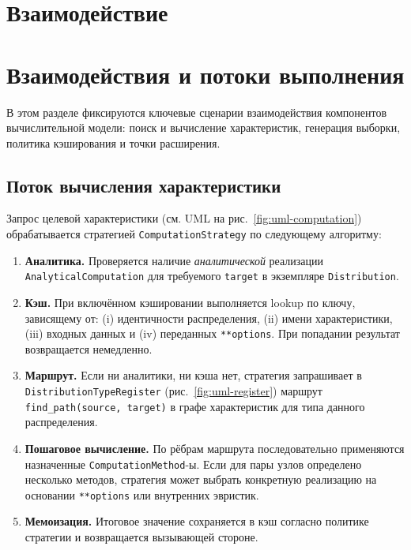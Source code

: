 \section{Взаимодействие}

\section{Взаимодействия и потоки выполнения}
\label{sec:interactions}

В этом разделе фиксируются ключевые сценарии взаимодействия компонентов вычислительной модели:
поиск и вычисление характеристик, генерация выборки, политика кэширования и точки расширения.

\subsection{Поток вычисления характеристики}

Запрос целевой характеристики (см. UML на рис.~\ref{fig:uml-computation}) обрабатывается стратегией
\texttt{ComputationStrategy} по следующему алгоритму:
\begin{enumerate}
  \item \textbf{Аналитика.} Проверяется наличие \emph{аналитической} реализации \texttt{AnalyticalComputation}
        для требуемого \texttt{target} в экземпляре \texttt{Distribution}.
  \item \textbf{Кэш.} При включённом кэшировании выполняется lookup по ключу, зависящему от:
        (i) идентичности распределения, (ii) имени характеристики, (iii) входных данных и
        (iv) переданных \texttt{**options}. При попадании результат возвращается немедленно.
  \item \textbf{Маршрут.} Если ни аналитики, ни кэша нет, стратегия запрашивает в
        \texttt{DistributionTypeRegister} (рис.~\ref{fig:uml-register}) маршрут
        \texttt{find\_path(source, target)} в графе характеристик для типа данного распределения.
  \item \textbf{Пошаговое вычисление.} По рёбрам маршрута последовательно применяются назначенные
        \texttt{ComputationMethod}-ы. Если для пары узлов определено несколько методов, стратегия может
        выбрать конкретную реализацию на основании \texttt{**options} или внутренних эвристик.
  \item \textbf{Мемоизация.} Итоговое значение сохраняется в кэш согласно политике стратегии и возвращается
        вызывающей стороне.
\end{enumerate}

